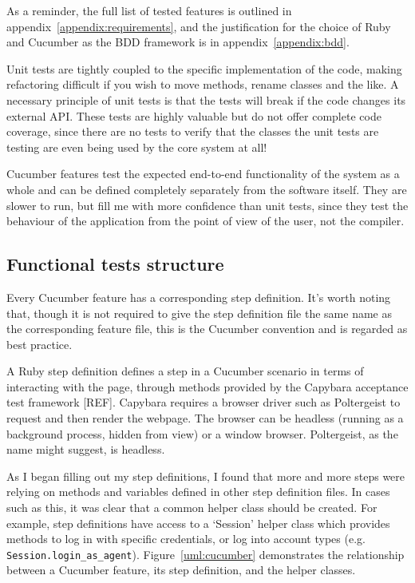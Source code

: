 As a reminder, the full list of tested features is outlined in appendix~\ref{appendix:requirements}, and the justification for the choice of Ruby and Cucumber as the BDD framework is in appendix~\ref{appendix:bdd}.

Unit tests are tightly coupled to the specific implementation of the code, making refactoring difficult if you wish to move methods, rename classes and the like. A necessary principle of unit tests is that the tests will break if the code changes its external API. These tests are highly valuable but do not offer complete code coverage, since there are no tests to verify that the classes the unit tests are testing are even being used by the core system at all!

Cucumber features test the expected end-to-end functionality of the system as a whole and can be defined completely separately from the software itself. They are slower to run, but fill me with more confidence than unit tests, since they test the behaviour of the application from the point of view of the user, not the compiler.

\subsection{Functional tests structure}

Every Cucumber feature has a corresponding step definition. It's worth noting that, though it is not required to give the step definition file the same name as the corresponding feature file, this is the Cucumber convention and is regarded as best practice.

A Ruby step definition defines a step in a Cucumber scenario in terms of interacting with the page, through methods provided by the Capybara acceptance test framework [REF]. Capybara requires a browser driver such as Poltergeist to request and then render the webpage. The browser can be headless (running as a background process, hidden from view) or a window browser. Poltergeist, as the name might suggest, is headless. %

As I began filling out my step definitions, I found that more and more steps were relying on methods and variables defined in other step definition files. In cases such as this, it was clear that a common helper class should be created. For example, step definitions have access to a `Session' helper class which provides methods to log in with specific credentials, or log into account types (e.g. \lstinline{Session.login_as_agent}). Figure~\ref{uml:cucumber} demonstrates the relationship between a Cucumber feature, its step definition, and the helper classes.

